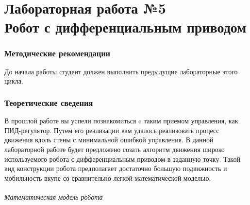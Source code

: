 \documentclass[12pt,a4paper,openany]{extarticle}
\begin{document}
\part*{Лабораторная работа №5\\
Робот с дифференциальным приводом}

\section{Методические рекомендации}
\hspace*{\parindent}До начала работы студент должен выполнить предыдущие лабораторные этого цикла.

\section{Теоретические сведения}
\hspace*{\parindent}В прошлой работе вы успели познакомиться c таким приемом управления, как ПИД-регулятор. Путем его реализации вам удалось реализовать процесс движения вдоль стены с минимальной ошибкой управления. В данной лабораторной работе будет предложено созать алгоритм движения широко используемого робота с дифференциальным приводом в заданную точку. Такой вид конструкции робота предполагает достаточно большую подвижность и мобильность вкупе со сравнительно легкой математической моделью. 


\paragraph*{Математическая модель робота}$\phantom{-}$\\
\hspace*{\parindent}
	
\end{document}
